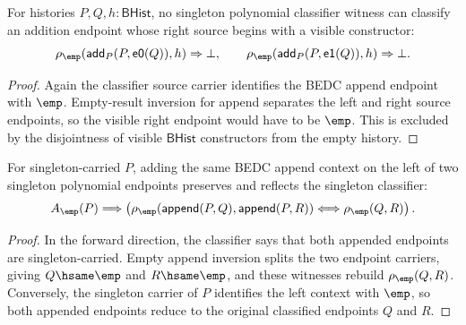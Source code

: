 \begin{theorem}
\label{thm:polynomial-singleton-add-visible-right-absurd}
For histories $P,Q,h:\mathsf{BHist}$, no singleton polynomial classifier
witness can classify an addition endpoint whose right source begins with a
visible constructor:
$$
\rho_{\emp}(\mathsf{add}_P(P,\mathsf{e0}(Q)),h)\Rightarrow\bot,
\qquad
\rho_{\emp}(\mathsf{add}_P(P,\mathsf{e1}(Q)),h)\Rightarrow\bot.
$$
\end{theorem}
\begin{proof}
Again the classifier source carrier identifies the BEDC append endpoint with
$\emp$. Empty-result inversion for append separates the left and right source
endpoints, so the visible right endpoint would have to be $\emp$. This is
excluded by the disjointness of visible $\mathsf{BHist}$ constructors from the
empty history.
\end{proof}

\begin{theorem}
\label{thm:polynomial-singleton-classifier-append-left-cancel}
For singleton-carried $P$, adding the same BEDC append context on the left of
two singleton polynomial endpoints preserves and reflects the singleton
classifier:
$$
A_{\emp}(P)\Longrightarrow
\left(
\rho_{\emp}(\mathsf{append}(P,Q),\mathsf{append}(P,R))
\Longleftrightarrow
\rho_{\emp}(Q,R)
\right).
$$
\end{theorem}
\begin{proof}
In the forward direction, the classifier says that both appended endpoints are
singleton-carried. Empty append inversion splits the two endpoint carriers,
giving $Q\hsame\emp$ and $R\hsame\emp$, and these witnesses rebuild
$\rho_{\emp}(Q,R)$. Conversely, the singleton carrier of $P$ identifies the
left context with $\emp$, so both appended endpoints reduce to the original
classified endpoints $Q$ and $R$.
\end{proof}

